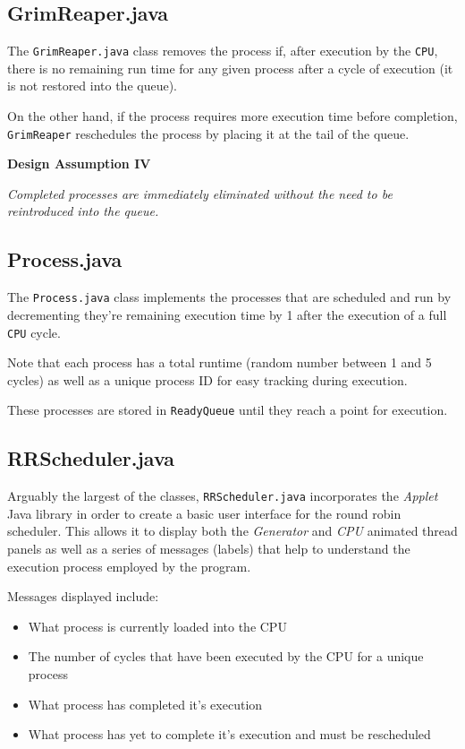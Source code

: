 \documentclass[]{report}
\begin{document}
\vspace{2mm}

\subsection*{GrimReaper.java}
The \verb|GrimReaper.java| class removes the process if, after execution by the \verb|CPU|, there is no remaining run time for any given process after a cycle of execution (it is not restored into the queue). \par 
On the other hand, if the process requires more execution time before completion, \verb|GrimReaper| reschedules the process by placing it at the tail of the queue.

\begin{mdframed}[backgroundcolor=lightgray!40]
	\textbf{Design Assumption IV} \par 
	\textit{Completed processes are immediately eliminated without the need to be reintroduced into the queue.}
\end{mdframed}

\vspace{2mm}

\subsection*{Process.java}
The \verb|Process.java| class implements the processes that are scheduled and run by decrementing they're remaining execution time by 1 after the execution of a full \verb|CPU| cycle. \par 
Note that each process has a total runtime (random number between 1 and 5 cycles) as well as a unique process ID for easy tracking during execution. \par 
These processes are stored in \verb|ReadyQueue| until they reach a point for execution.

\vspace{2mm}

\subsection*{RRScheduler.java}
Arguably the largest of the classes, \verb|RRScheduler.java| incorporates the \textit{Applet} Java library in order to create a basic user interface for the round robin scheduler. This allows it to display both the \textit{Generator} and \textit{CPU} animated thread panels as well as a series of messages (labels) that help to understand the execution process employed by the program. \par 
Messages displayed include:
\begin{itemize}
	\item What process is currently loaded into the CPU
	\item The number of cycles that have been executed by the CPU for a unique process
	\item What process has completed it's execution 
	\item What process has yet to complete it's execution and must be rescheduled
\end{itemize}
\end{document}
